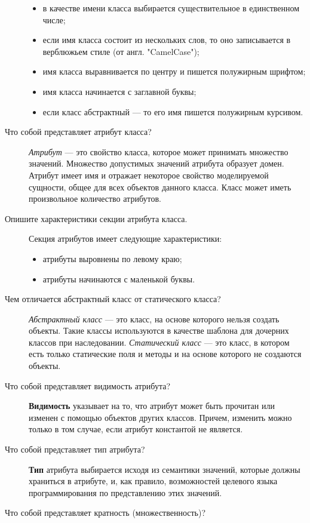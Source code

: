 \begin{description}
		\begin{itemize}
			\item в качестве имени класса выбирается существительное в
				единственном числе;
			\item если имя класса состоит из нескольких слов, то оно
				записывается в верблюжьем стиле (от англ. "CamelCase");
			\item имя класса выравнивается по центру и пишется полужирным
				шрифтом;
			\item имя класса начинается с заглавной буквы;
			\item если класс абстрактный — то его имя пишется полужирным
				курсивом.
		\end{itemize}
	\item [Что собой представляет атрибут класса?]
		\textit{Атрибут} --- это свойство класса, которое может принимать
		множество значений. Множество допустимых значений атрибута образует
		домен. Атрибут имеет имя и отражает некоторое свойство моделируемой
		сущности, общее для всех объектов данного класса. Класс может иметь
		произвольное количество атрибутов.
	\item [Опишите характеристики секции атрибута класса.]
		Секция атрибутов имеет следующие характеристики:
		\begin{itemize}
			\item атрибуты выровнены по левому краю;
			\item атрибуты начинаются с маленькой буквы.
		\end{itemize}
	\item [Чем отличается абстрактный класс от статического класса?]
		\textit{Абстрактный класс} --- это класс, на основе которого нельзя
		создать объекты. Такие классы используются в качестве шаблона для
		дочерних классов при наследовании.
		\textit{Статический класс} --- это класс, в котором есть только
		статические поля и методы и на основе которого не создаются объекты.
	\item [Что собой представляет видимость атрибута?]
		\textbf{Видимость} указывает на то, что атрибут может быть прочитан
		или изменен с помощью объектов других классов. Причем, изменить
		можно только в том случае, если атрибут константой не является.
	\item [Что собой представляет тип атрибута?]
		\textbf{Тип} атрибута выбирается исходя из семантики значений,
		которые должны храниться в атрибуте, и, как правило, возможностей
		целевого языка программирования по представлению этих значений.
	\item [Что собой представляет кратность (множественность)?]

\end{description}
